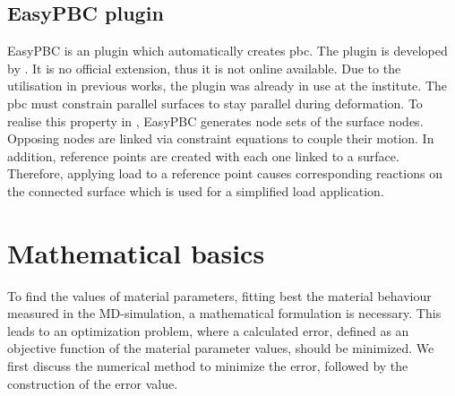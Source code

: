 \subsection{EasyPBC plugin} \label{subsec: EasPBC}

EasyPBC is an  plugin which automatically creates \acrshort{pbc}. The plugin is developed by \citet{omairey_development_2019}. It is no official  extension, thus it is not online available. Due to the utilisation in previous works, the plugin was already in use at the institute. The \acrshort{pbc} must constrain parallel surfaces to stay parallel during deformation. To realise this property in , EasyPBC generates node sets of the surface nodes. Opposing nodes are linked via constraint equations to couple their motion. In addition, reference points are created with each one linked to a surface. Therefore, applying load to a reference point causes corresponding reactions on the connected surface which is used for a simplified load application. 








\section{Mathematical basics} \label{sec: mathematics}

To find the values of material parameters, fitting best the material behaviour measured in the MD-simulation, a mathematical formulation is necessary. This leads to an optimization problem, where a calculated error, defined as an objective function of the material parameter values, should be minimized. We first discuss the numerical method to minimize the error, followed by the construction of the error value.

